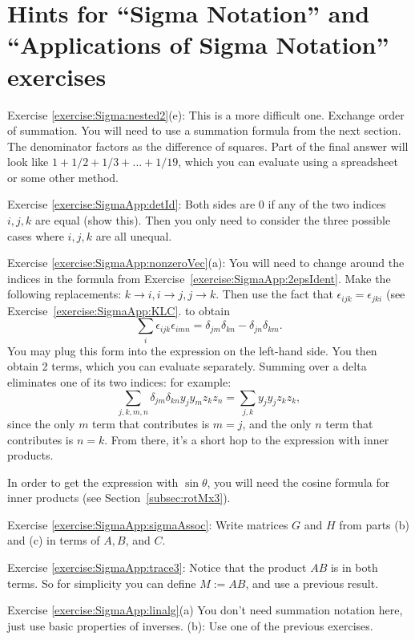 \section{Hints for ``Sigma Notation'' and ``Applications of Sigma Notation''  exercises}
\label{sec:SigmaNotation:Hints} 

\noindent Exercise \ref{exercise:Sigma:nested2}(e): This is a more difficult one.  Exchange order of summation. You will need to use a summation formula from the next section.  The denominator factors as the difference of squares.  Part of the final answer will look like $1 + 1/2 + 1/3 + \ldots + 1/19$, which you can evaluate using a spreadsheet or some other method. 

\noindent Exercise \ref{exercise:SigmaApp:detId}: Both sides are 0 if any of the two indices $i,j,k$ are equal (show this). Then you only need to consider the three possible cases where $i,j,k$ are all unequal.

\noindent Exercise \ref{exercise:SigmaApp:nonzeroVec}(a): You will need to change around the indices in the formula from Exercise~\ref{exercise:SigmaApp:2epsIdent}. Make the following replacements: $k \rightarrow i, i \rightarrow j, j \rightarrow k$.  Then use the fact that $\epsilon_{ijk}= \epsilon_{jki}$ (see Exercise~\ref{exercise:SigmaApp:KLC}.  to obtain
\[\sum_i \epsilon_{ijk} \epsilon_{imn} = \delta_{jm} \delta_{kn} - \delta_{jn} \delta_{km}. \]
You may plug this form into the expression on the left-hand side. You then obtain 2 terms, which you can evaluate separately. Summing over a delta  eliminates one of its two indices: for example:
\[ \sum_{j,k,m,n} \delta_{jm} \delta_{kn}  y_j y_m z_k z_n  = \sum_{j,k} y_j y_j z_k z_k, \]
since the only $m$ term that contributes is $m=j$, and the only $n$ term that contributes is $n=k$. From there, it's a short hop to the expression with inner products.

In order to get the expression with $\sin \theta$, you will need the cosine formula for inner products (see Section~\ref{subsec:rotMx3}).

\noindent Exercise \ref{exercise:SigmaApp:sigmaAssoc}: Write matrices $G$ and $H$ from parts (b) and (c) in terms of $A,B$, and $C$.

\noindent Exercise \ref{exercise:SigmaApp:trace3}: Notice that the product ${AB}$ is in both terms. So for simplicity you can define $M := AB$, and use a previous result.

\noindent Exercise \ref{exercise:SigmaApp:linalg}(a) You don't need summation notation here, just use basic properties of inverses. (b): Use one of the previous exercises.

